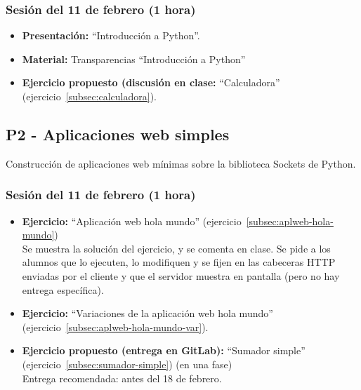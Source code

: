 \documentclass[a4paper,12pt]{article}
\begin{document}
\subsubsection{Sesión del 11 de febrero (1 hora)}

\begin{itemize}
\item \textbf{Presentación:} ``Introducción a Python''.
\item \textbf{Material:} Transparencias ``Introducción a Python''

\item \textbf{Ejercicio propuesto (discusión en clase:} ``Calculadora'' (ejercicio~\ref{subsec:calculadora}).

\end{itemize}

\subsection{P2 - Aplicaciones web simples}


Construcción de aplicaciones web mínimas sobre la biblioteca Sockets de Python.


\subsubsection{Sesión del 11 de febrero (1 hora)}
\begin{itemize}
 \item \textbf{Ejercicio:} ``Aplicación web hola mundo'' (ejercicio~\ref{subsec:aplweb-hola-mundo}) \\
   Se muestra la solución del ejercicio, y se comenta en clase. Se pide a los alumnos que lo ejecuten, lo modifiquen y se fijen en las cabeceras HTTP enviadas por el cliente y que el servidor muestra en pantalla (pero no hay entrega específica).
 \item \textbf{Ejercicio:} ``Variaciones de la aplicación web hola mundo'' (ejercicio~\ref{subsec:aplweb-hola-mundo-var}).
\item \textbf{Ejercicio propuesto (entrega en GitLab):} ``Sumador simple'' (ejercicio~\ref{subsec:sumador-simple}) (en una fase) \\
   Entrega recomendada: antes del 18 de febrero.
\end{itemize}
\end{document}
